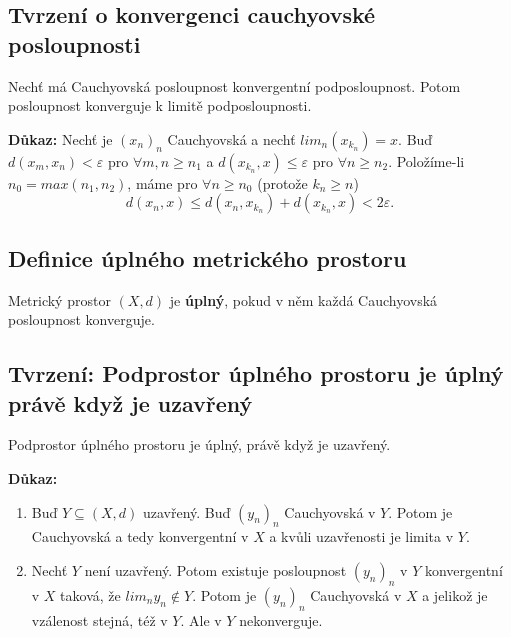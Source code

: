 \documentclass[../main.tex]{subfiles}
\begin{document}
\subsection{Tvrzení o konvergenci cauchyovské posloupnosti}
\hspace{1.2mm}
\noindent
Nechť má Cauchyovská posloupnost konvergentní podposloupnost. Potom posloupnost konverguje k limitě
podposloupnosti.

\vspace{5mm}
\noindent
\textbf{Důkaz:} Nechť je $(x_n)_n$ Cauchyovská a nechť $lim_{n}(x_{k_n}) = x.$ Buď $d(x_m,x_n) < \varepsilon$ pro $ \forall m,n \geq n_1$ 
a $d(x_{k_n},x) \leq \varepsilon$ pro $\forall n \geq n_2$. Položíme-li $n_0 = max(n_1,n_2)$, máme pro $\forall n \geq n_0$ (protože $k_n \geq n$)
\[d(x_n,x) \leq d(x_n,x_{k_n}) + d(x_{k_n},x) < 2\varepsilon.\]

\subsection{Definice úplného metrického prostoru}
\hspace{1.2mm}
\noindent
Metrický prostor $(X,d)$ je \textbf{úplný}, pokud v něm každá Cauchyovská posloupnost konverguje.

\subsection{Tvrzení: Podprostor úplného prostoru je úplný právě když je uzavřený}
\hspace{1.2mm}
\noindent
Podprostor úplného prostoru je úplný, právě když je uzavřený.

\vspace{5mm}
\noindent
\textbf{Důkaz:} 
\begin{enumerate}
    \item Buď $Y \subseteq (X,d)$ uzavřený. Buď $(y_n)_n$ Cauchyovská v $Y$. Potom je Cauchyovská 
    a tedy konvergentní v $X$ a kvůli uzavřenosti je limita v $Y$.
    \item Nechť $Y$ není uzavřený. Potom existuje posloupnost $(y_n)_n$ v $Y$ konvergentní v $X$ taková, že $lim_n y_n \notin Y$.
    Potom je $(y_n)_n$ Cauchyovská v $X$ a jelikož je vzálenost stejná, též v $Y$. Ale v $Y$ nekonverguje.
\end{enumerate}
\end{document}
